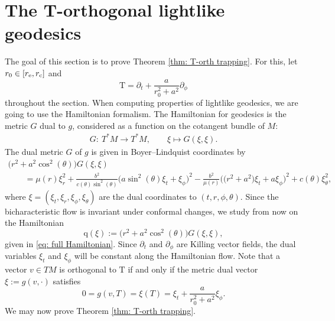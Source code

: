 \documentclass[10pt,a4paper]{amsart}
\renewcommand{\d}{\partial}
\newcommand{\T}{\mathrm T}
\newcommand{\q}{\mathrm q}
\numberwithin{equation}{section}
\begin{document}
\section{The T-orthogonal lightlike geodesics}

The goal of this section is to prove Theorem \ref{thm: T-orth trapping}.
For this, let $r_0 \in [r_{\rm e}, r_{\rm c}]$
and
\[
	\T
		= \d_t + \frac a{r_0^2 + a^2} \d_\phi
\]
throughout the section.
When computing properties of lightlike geodesics, we are going to use the Hamiltonian formalism.
The Hamiltonian for geodesics is the metric $G$ dual to $g$, considered as a function on the cotangent bundle of $M$:
\begin{align*}
	G\colon\ T^*M
		\to T^*M, \qquad
	\xi
		\mapsto G(\xi, \xi).
\end{align*}
The dual metric $G$ of $g$ is given in Boyer--Lindquist coordinates by
\begin{gather}
	\big(r^2 + a^2 \cos^2(\theta)\big)G(\xi, \xi)\nonumber\\
		\qquad= \mu(r) \xi_r^2 + \frac{b^2}{c(\theta)\sin^2(\theta)}\big(a \sin^2(\theta)\xi_t + \xi_\phi\big)^2 - \frac{b^2}{\mu(r)} \big(\big(r^2 + a^2\big) \xi_t + a \xi_\phi \big)^2 + c(\theta) \xi_\theta^2,
 \label{eq: full Hamiltonian}
\end{gather}
where $\xi = (\xi_t, \xi_r, \xi_\phi, \xi_\theta)$ are the dual coordinates to $(t, r, \phi, \theta)$.
Since the bicharacteristic flow is invariant under conformal changes, we study from now on the Hamiltonian
\[
	\q(\xi)
		:= \big(r^2 + a^2 \cos^2(\theta)\big)G(\xi, \xi),
\]
given in \eqref{eq: full Hamiltonian}.
Since $\d_t$ and $\d_\phi$ are Killing vector fields, the dual variables $\xi_t$ and $\xi_\phi$ will be constant along the Hamiltonian flow.
Note that a vector $v \in TM$ is orthogonal to $\T$ if and only if the metric dual vector $\xi
		:= g(v, \cdot)$ satisfies
\begin{equation} \label{eq: F vanishing}
	0
		= g(v, T)
		= \xi(T)
		= \xi_t + \frac a{r_0^2 + a^2} \xi_\phi.
\end{equation}
We may now prove Theorem \ref{thm: T-orth trapping}.
\end{document}
